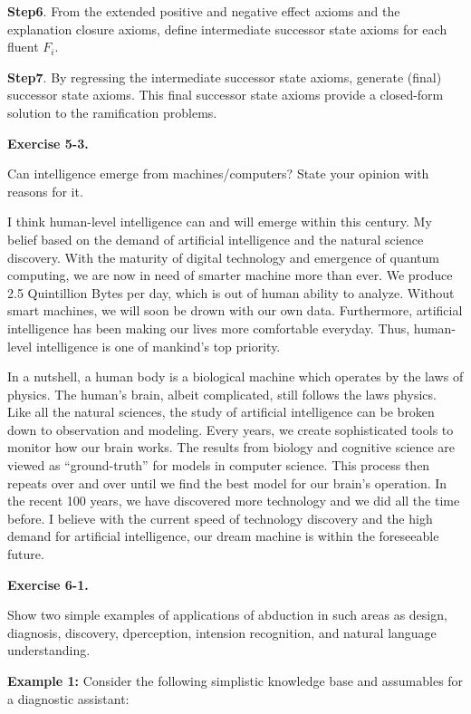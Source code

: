 \documentclass[12pt,twoside]{article}
\begin{document}
\begin{exercises}
\textbf{Step6}.
From the extended positive and negative effect axioms and the explanation closure axioms, define intermediate successor state axioms for each fluent $F_i$.

\textbf{Step7}. By regressing the intermediate successor state axioms, generate (ﬁnal) successor state axioms. This ﬁnal successor state axioms provide a closed-form solution to the ramiﬁcation problems.
\fi

\textbf{Exercise 5-3.}

Can intelligence emerge from machines/computers? State your opinion with reasons for it.

\ifsolution \solution{}

I think human-level intelligence can and will emerge within this century. My belief based on the demand of artificial intelligence and the natural science discovery. With the maturity of digital technology and emergence of quantum computing, we are now in need of smarter machine more than ever. We produce 2.5 Quintillion Bytes per day, which is out of human ability to analyze. Without smart machines, we will soon be drown with our own data. Furthermore, artificial intelligence has been making our lives more comfortable everyday. Thus, human-level intelligence is one of mankind's top priority. 

In a nutshell, a human body is a biological machine which operates by the laws of physics. The human's brain, albeit complicated, still follows the laws physics. Like all the natural sciences, the study of artificial intelligence can be broken down to observation and modeling. Every years, we create sophisticated tools to monitor how our brain works. The results from biology and cognitive science are viewed as ``ground-truth'' for models in computer science. This process then repeats over and over until we find the best model for our brain's operation. In the recent 100 years, we have discovered more technology and we did all the time before. I believe with the current speed of technology discovery and the high demand for artificial intelligence, our dream machine is within the foreseeable future.
\fi

\textbf{Exercise 6-1.}

Show two simple examples of applications of abduction in such areas as design, diagnosis, discovery, dperception, intension recognition, and natural language understanding.

\ifsolution \solution{}

\textbf{Example 1:} Consider the following simplistic knowledge base and assumables for a diagnostic assistant:


\end{exercises}
\end{document}

